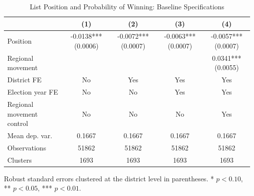 \begin{table}[htbp]
\centering
\caption{List Position and Probability of Winning: Baseline Specifications}
\label{tab:baseline_specs}
\begin{tabular}{lcccc}
\toprule
 & (1) & (2) & (3) & (4) \\
\midrule
Position & -0.0138*** (0.0006) & -0.0072*** (0.0007) & -0.0063*** (0.0007) & -0.0057*** (0.0007) \\
Regional movement &  &  &  & 0.0341*** (0.0055) \\
\midrule
District FE & No & Yes & Yes & Yes \\
Election year FE & No & No & Yes & Yes \\
Regional movement control & No & No & No & Yes \\
Mean dep. var. & 0.1667 & 0.1667 & 0.1667 & 0.1667 \\
Observations & 51862 & 51862 & 51862 & 51862 \\
Clusters & 1693 & 1693 & 1693 & 1693 \\
\bottomrule
\end{tabular}
\begin{flushleft}
\footnotesize Robust standard errors clustered at the district level in parentheses. * $p<0.10$, ** $p<0.05$, *** $p<0.01$.
\end{flushleft}
\end{table}